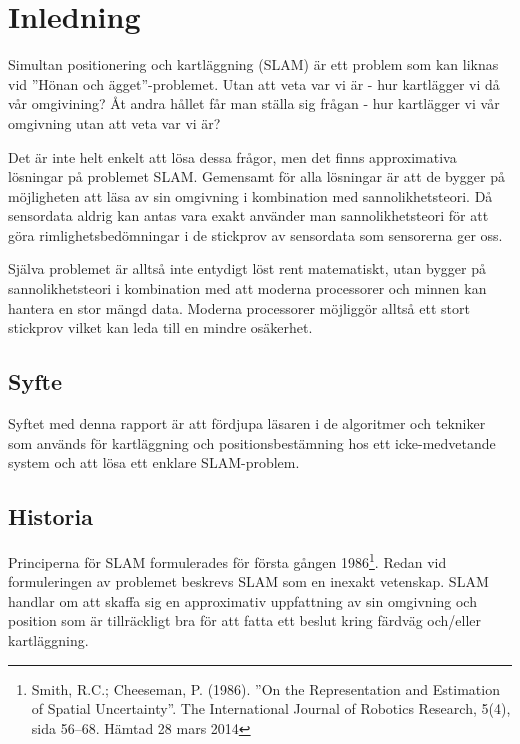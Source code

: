 \documentclass[a4paper,12pt,fleqn]{article}
\begin{document}
\addto\captionsswedish{\renewcommand{\contentsname}{Innehållsförteckning}}

\tableofcontents
\thispagestyle{fancy}
\newpage


\section{Inledning}

Simultan positionering och kartläggning (SLAM) är ett problem som kan liknas vid ''Hönan och ägget''-problemet. Utan att veta var vi är - hur kartlägger vi då vår omgivining? Åt andra hållet får man ställa sig frågan - hur kartlägger vi vår omgivning utan att veta var vi är? 

Det är inte helt enkelt att lösa dessa frågor, men det finns approximativa lösningar på problemet SLAM. Gemensamt för alla lösningar är att de bygger på möjligheten att läsa av sin omgivning i kombination med
sannolikhetsteori. Då sensordata aldrig kan antas vara exakt använder man sannolikhetsteori för att göra rimlighetsbedömningar i de stickprov av sensordata som sensorerna ger oss.

Själva problemet är alltså inte entydigt löst rent matematiskt, utan
bygger på sannolikhetsteori i kombination med att moderna processorer
och minnen kan hantera en stor mängd data. Moderna processorer möjliggör
alltså ett stort stickprov vilket kan leda till en mindre osäkerhet.

\subsection{Syfte}
Syftet med denna rapport är att fördjupa läsaren i de algoritmer och tekniker som används för kartläggning och positionsbestämning hos ett icke-medvetande system och att lösa ett enklare SLAM-problem.

\subsection{Historia}

Principerna för SLAM formulerades för första gången 1986\footnote{Smith, R.C.; Cheeseman, P. (1986).
''On the Representation and Estimation of Spatial Uncertainty''. The
International Journal of Robotics Research, 5(4), sida 56–68. Hämtad 28 mars 2014}. Redan vid formuleringen av problemet beskrevs SLAM som en inexakt vetenskap. SLAM handlar om att skaffa sig en approximativ uppfattning av sin omgivning och position som är tillräckligt bra för att fatta ett beslut kring färdväg och/eller kartläggning. 
\end{document}

